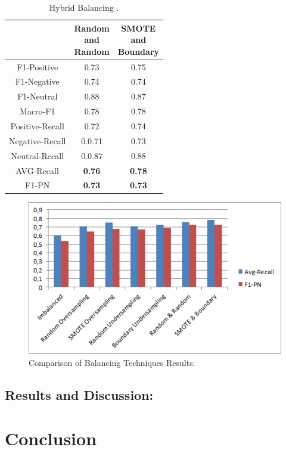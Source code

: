 \documentclass[conference]{IEEEtran}
\begin{document}
\begin{table}[!ht]
	\large        %
	\caption{Hybrid Balancing .}\label{label}
	\centering    %
	\begin{tabular}{|c|c|c|}
		\hline
		\thead{} &\thead{Random \\ and \\ Random}&\thead{SMOTE \\and\\ Boundary}\\     %
		\hline
		F1-Positive&0.73 &0.75\\
		\hline
		F1-Negative&0.74&0.74\\
		\hline
		F1-Neutral&0.88&0.87\\
		\hline
		Macro-F1&0.78&0.78\\
		\hline
		Positive-Recall&0.72&0.74\\
		\hline
		Negative-Recall&0.0.71&0.73\\
		\hline
		Neutral-Recall&0.0.87&0.88\\
		\hline
		AVG-Recall&\textbf{0.76}&\textbf{0.78}\\
		\hline
		F1-PN&\textbf{0.73}&\textbf{0.73}\\
		\hline
	\end{tabular}
\end{table}
\begin{figure}[htbp]
	\centerline{\includegraphics[scale=0.80]{images/chart}}
	\caption{Comparison of Balancing Techniques Results.}
	\label{fig}
\end{figure}

\subsection{Results and Discussion:}\label{AA}

	
\section{Conclusion}
	
	
	
	
	
\end{document}
